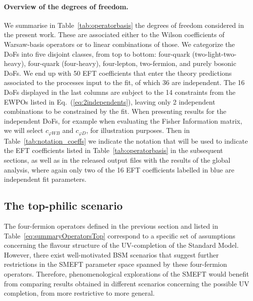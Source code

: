 \paragraph{Overview of the degrees of freedom.}
%
We summarise in Table~\ref{tab:operatorbasis}
the degrees of freedom  considered in the present work.
%
These are associated either to the Wilson coefficients of Warsaw-basis operators
or to linear combinations of those.
%
We categorize the DoFs into five disjoint classes, from top to bottom: four-quark (two-light-two-heavy), four-quark (four-heavy), four-lepton, two-fermion, and purely bosonic DoFs.
%
We end up with 50 EFT coefficients that enter the theory predictions associated to the processes
input to the fit, of which 36 are independent.
%
The 16 DoFs displayed in the last columns are subject to the 14 constraints from the EWPOs
listed in Eq.~(\ref{eq:2independents}),
leaving only 2 independent combinations to be constrained by the fit.
%
When presenting results for the independent DoFs, for example when evaluating the
Fisher Information matrix, we will select $c_{\varphi W B}$ and $c_{\varphi D}$,
for illustration purposes.
%
Then in Table~\ref{tab:notation_coeffs} we indicate the
notation that will be used to indicate the EFT coefficients
listed in  Table~\ref{tab:operatorbasis} in the
subsequent sections, as well as in the released output files
with the results of the global analysis,
where again
only two of the 16 EFT coefficients labelled in blue are independent fit parameters.





\subsection{The top-philic scenario}
\label{sec:topphilic}

The four-fermion operators defined in the previous section and listed in
Table~\ref{eq:summaryOperatorsTop}
correspond to a specific set of assumptions concerning
the flavour structure of the UV-completion of the Standard Model.
%
However, there exist well-motivated BSM scenarios that suggest further
restrictions in the SMEFT parameter space spanned
by these four-fermion operators.
%
Therefore, phenomenological explorations of the SMEFT would benefit from comparing
results obtained in different scenarios concerning the possible UV completion,
from more restrictive to more general.

